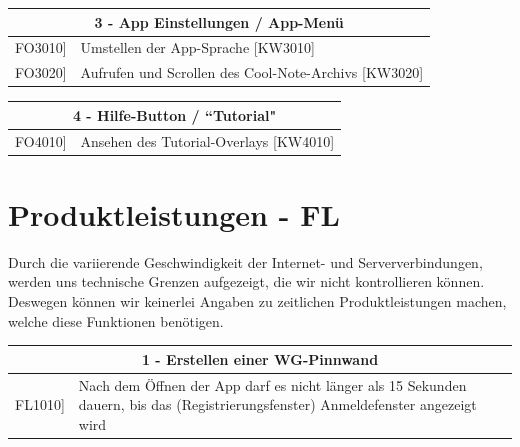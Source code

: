 \documentclass[a4paper]{scrreprt}
\begin{document}
    		\vspace{5mm}
    		
    		\begin{table}[h!]
    			\centering
    			\label{my-label}
    			\begin{tabular}{p{2cm}p{12cm}}
    				
    				\multicolumn{2}{c}{\textbf{3 - App Einstellungen / App-Menü}} \\ \hline
    				\centering{[}FO3010{]} & Umstellen der App-Sprache {[}KW3010{]}\\
    				\centering{[}FO3020{]} & Aufrufen und Scrollen des Cool-Note-Archivs {[}KW3020{]}\\
    				\hline
    			\end{tabular}
    		\end{table}
    		
    		\vspace{5mm}
    		
    		\begin{table}[h!]
    			\centering
    			\label{my-label}
    			\begin{tabular}{p{2cm}p{12cm}}
    				
    				\multicolumn{2}{c}{\textbf{4 - Hilfe-Button / ``Tutorial"}} \\ \hline
    				\centering{[}FO4010{]} & Ansehen des Tutorial-Overlays {[}KW4010{]}\\    				
    				\hline
    			\end{tabular}
    		\end{table}
    		
    		\vspace{1cm}
    		
    		\newpage
    		
    		\section{Produktleistungen - FL}
    		Durch die variierende Geschwindigkeit der Internet- und Serververbindungen, werden uns technische Grenzen aufgezeigt, die wir nicht kontrollieren können. Deswegen können wir keinerlei Angaben zu zeitlichen Produktleistungen machen, welche diese Funktionen benötigen. 
    		\\
    		
    		\begin{table}[h!]
    			\centering
    			\label{my-label}
    			\begin{tabular}{p{2cm}p{12cm}}
    				
    				\multicolumn{2}{c}{\textbf{1 - Erstellen einer WG-Pinnwand}} \\ \hline
    				\centering{[}FL1010{]} & Nach dem Öffnen der App darf es nicht länger als 15 Sekunden dauern, bis das (Registrierungsfenster) Anmeldefenster angezeigt wird \\
    				\hline
    			\end{tabular}
    		\end{table}
    		
\end{document}
